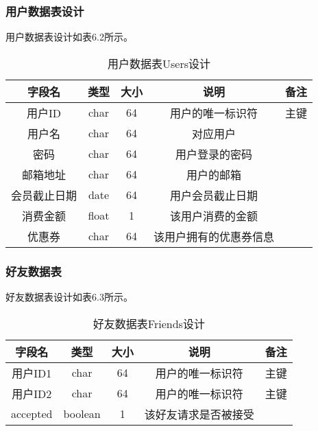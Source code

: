 {
\color{red}
\subsubsection{用户数据表设计}
用户数据表设计如表6.2所示。
\begin{table}[htbp]
\centering
\caption{用户数据表Users设计} \label{tab:user-database}
\begin{tabular}{|c|c|c|c|c|}
    \hline
    字段名 & 类型 & 大小 & 说明 & 备注 \\
    \hline
    用户ID & char & 64 & 用户的唯一标识符 & 主键\\
    \hline
    用户名 & char & 64 & 对应用户 & \\
    \hline
    密码 & char & 64 & 用户登录的密码 & \\
    \hline
    邮箱地址 & char & 64 & 用户的邮箱 & \\
    \hline
    会员截止日期 & date & 64 & 用户会员截止日期 & \\
    \hline
    消费金额 & float & 1 & 该用户消费的金额 & \\
    \hline
    优惠券 & char & 64 & 该用户拥有的优惠券信息 & \\
    \hline
\end{tabular}
\end{table}

\subsubsection{好友数据表}
好友数据表设计如表6.3所示。
\begin{table}[htbp]
\centering
\caption{好友数据表Friends设计} \label{tab:friend-database}
\begin{tabular}{|c|c|c|c|c|}
    \hline
    字段名 & 类型 & 大小 & 说明 & 备注 \\
    \hline
    用户ID1 & char & 64 & 用户的唯一标识符 & 主键\\
    \hline
    用户ID2 & char & 64 & 用户的唯一标识符 & 主键\\
    \hline
    accepted  & boolean & 1 & 该好友请求是否被接受 & \\
    \hline
\end{tabular}
\end{table}

}
